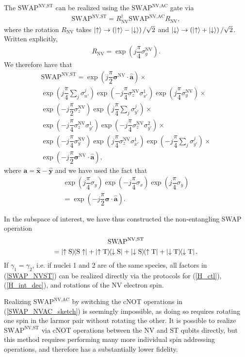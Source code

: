 \documentclass[twocolumn]{revtex4}
\renewcommand{\t}{\text} %
\newcommand{\f}[2]{\dfrac{#1}{#2}} %
\newcommand{\p}[1]{\left(#1\right)} %
\renewcommand{\v}{\bm} %
\newcommand{\uv}[1]{\hat{\v{#1}}} %
\renewcommand{\c}{\cdot} %
\renewcommand{\u}{\uparrow}
\renewcommand{\d}{\downarrow}
\newcommand{\SWAP}{\t{SWAP}}
\newcommand{\NV}{\t{NV}}
\newcommand{\AC}{\t{AC}}
\newcommand{\ST}{\t{ST}}
\renewcommand{\S}{\t{S}}
\newcommand{\T}{\t{T}}
\begin{document}
The $\SWAP^{\NV,\ST}$ can be realized using the $\SWAP^{\NV,\AC}$ gate
via
\begin{align}
  \SWAP^{\NV,\ST} = R_\NV^\dagger \SWAP^{\NV,\AC} R_\NV,
\end{align}
where the rotation $R_\NV$ takes $\ket\u\to\p{\ket\u-\ket\d}/\sqrt2$
and $\ket\d\to\p{\ket\u+\ket\d}/\sqrt2$. Written explicitly,
\begin{align}
  R_\NV = \exp\p{j\f\pi4\sigma_y^\NV}.
\end{align}
We therefore have that
\begin{multline}
  \SWAP^{\NV,\ST} = \exp\p{j\f\pi2\v\sigma^\NV\c\uv a}
  \times \\
  \exp\p{j\f\pi4\sum_j\sigma_{n'}^j}
  \exp\p{-j\f\pi4\sigma_z^\NV\sigma_{x'}^1}
  \exp\p{j\f\pi4\sigma_y^\NV}
  \times \\
  \exp\p{-j\f\pi2\sigma_z^\NV} \exp\p{j\f\pi4\sum_j\sigma_{y'}^j}
  \times \\
  \exp\p{-j\f\pi4\sigma_z^\NV\sigma_{y'}^1}
  \exp\p{-j\f\pi4\sigma_z^\NV\sigma_{y'}^2}
  \times \\
  \exp\p{-j\f\pi4\sigma_y^\NV}
  \exp\p{j\f\pi4\sigma_z^\NV\sigma_{x'}^1}
  \exp\p{-j\f\pi4\sum_j\sigma_{y'}^j}
  \times \\
  \exp\p{-j\f\pi2\v\sigma^\NV\c\uv a},
  \label{SWAP_NVST}
\end{multline}
where $\v a = \uv x - \uv y$ and we have used the fact that
\begin{multline}
  \exp\p{j\f\pi4\sigma_y} \exp\p{-j\f\pi4\sigma_x}
  \exp\p{j\f\pi4\sigma_y} \\
  = \exp\p{-j\f\pi2\v\sigma\c\uv a}.
\end{multline}

In the subspace of interest, we have thus
constructed the non-entangling SWAP operation
\begin{multline}
  \SWAP^{\NV,\ST} \\
  = \op{\u\S}{\S\u} + \op{\u\T}{\d\S} + \op{\d\S}{\u\T} +
  \op{\d\T}{\d\T}.
\end{multline}
If $\gamma_1=\gamma_2$, i.e. if nuclei 1 and 2 are of the same
species, all factors in (\ref{SWAP_NVST}) can be realized directly via
the protocols for (\ref{H_ctl}), (\ref{H_int_dec}), and rotations of
the NV electron spin.

Realizing $\SWAP^{\NV,\AC}$ by switching the cNOT operations in
(\ref{SWAP_NVAC_sketch}) is seemingly impossible, as doing so requires
rotating one spin in the larmor pair without rotating the other. It is
possible to realize $\SWAP^{\NV,\ST}$ via cNOT operations between the
NV and ST qubits directly, but this method requires performing many
more individual spin addressing operations, and therefore has a
substantially lower fidelity.
\end{document}
